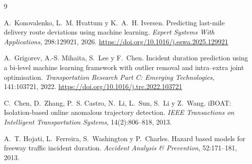 \documentclass[12pt, a4paper]{article}
\begin{document}
\begin{thebibliography}{9}

A.~Konovalenko, L.~M. Hvattum y K.~A.~H. Iversen.
\newblock Predicting last-mile delivery route deviations using machine learning.
\newblock \emph{Expert Systems With Applications}, 298:129921, 2026.
\newblock \url{https://doi.org/10.1016/j.eswa.2025.129921}

A.~Grigorev, A.-S. Mihaita, S.~Lee y F.~Chen.
\newblock Incident duration prediction using a bi-level machine learning
  framework with outlier removal and intra--extra joint optimisation.
\newblock \emph{Transportation Research Part C: Emerging Technologies},
  141:103721, 2022.
\newblock \url{https://doi.org/10.1016/j.trc.2022.103721}

C.~Chen, D.~Zhang, P.~S. Castro, N.~Li, L.~Sun, S.~Li y Z.~Wang.
\newblock iBOAT: Isolation-based online anomalous trajectory detection.
\newblock \emph{IEEE Transactions on Intelligent Transportation Systems},
  14(2):806--818, 2013.

A.~T. Hojati, L.~Ferreira, S.~Washington y P.~Charles.
\newblock Hazard based models for freeway traffic incident duration.
\newblock \emph{Accident Analysis \& Prevention}, 52:171--181, 2013.

\end{thebibliography}
\end{document}
